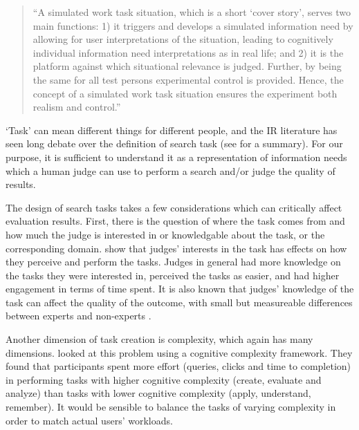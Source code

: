 
\begin{quote}
``A simulated work task situation, which is a short `cover story', serves two main functions: 1) it triggers and develops a simulated information need by allowing for user interpretations of the situation, leading to cognitively individual information need interpretations as in real life; and 2) it is the platform against which situational relevance is judged. Further, by being the same for all test persons experimental control is provided. Hence, the concept of a simulated work task situation ensures the experiment both realism and control.''
\end{quote}

`Task' can mean different things for different people, and the IR literature has seen long debate over the definition of search task (see \cite{kelly2009methods} for a summary). For our purpose, it is sufficient to understand it as a representation of information needs which a human judge can use to perform a search and/or judge the quality of results.

The design of search tasks takes a few considerations which can critically affect evaluation results. First, there is the question of where the task comes from and how much the judge is interested in or knowledgable about the task, or the corresponding domain. \cite{Edwards:2016} show that judges' interests in the task has effects on how they perceive and perform the tasks. Judges in general had more knowledge on the tasks they were interested in, perceived the tasks as easier, and had higher engagement in terms of time spent. It is also known that judges' knowledge of the task can affect the quality of the outcome, with small but measureable differences between experts and non-experts \citep{Bailey:2008}.

Another dimension of task creation is complexity, which again has many dimensions. \cite{Kelly:2015} looked at this problem using a cognitive complexity framework. They found that participants spent more effort (queries, clicks and time to completion) in performing tasks with higher cognitive complexity (create, evaluate and analyze) than tasks with lower cognitive complexity (apply, understand, remember). It would be sensible to balance the tasks of varying complexity in order to match actual users' workloads.

